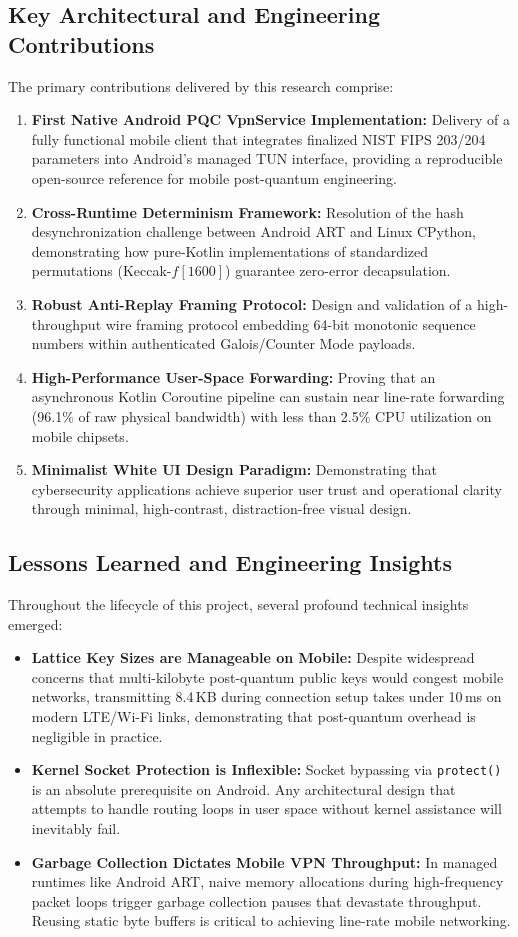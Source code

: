 \subsection{Key Architectural and Engineering Contributions}
The primary contributions delivered by this research comprise:
\begin{enumerate}
    \item \textbf{First Native Android PQC VpnService Implementation:} Delivery of a fully functional mobile client that integrates finalized NIST FIPS 203/204 parameters into Android's managed TUN interface, providing a reproducible open-source reference for mobile post-quantum engineering.
    \item \textbf{Cross-Runtime Determinism Framework:} Resolution of the hash desynchronization challenge between Android ART and Linux CPython, demonstrating how pure-Kotlin implementations of standardized permutations (Keccak-$f[1600]$) guarantee zero-error decapsulation.
    \item \textbf{Robust Anti-Replay Framing Protocol:} Design and validation of a high-throughput wire framing protocol embedding 64-bit monotonic sequence numbers within authenticated Galois/Counter Mode payloads.
    \item \textbf{High-Performance User-Space Forwarding:} Proving that an asynchronous Kotlin Coroutine pipeline can sustain near line-rate forwarding (96.1\% of raw physical bandwidth) with less than 2.5\% CPU utilization on mobile chipsets.
    \item \textbf{Minimalist White UI Design Paradigm:} Demonstrating that cybersecurity applications achieve superior user trust and operational clarity through minimal, high-contrast, distraction-free visual design.
\end{enumerate}

\subsection{Lessons Learned and Engineering Insights}
Throughout the lifecycle of this project, several profound technical insights emerged:
\begin{itemize}
    \item \textbf{Lattice Key Sizes are Manageable on Mobile:} Despite widespread concerns that multi-kilobyte post-quantum public keys would congest mobile networks, transmitting 8.4\,KB during connection setup takes under 10\,ms on modern LTE/Wi-Fi links, demonstrating that post-quantum overhead is negligible in practice.
    \item \textbf{Kernel Socket Protection is Inflexible:} Socket bypassing via \texttt{protect()} is an absolute prerequisite on Android. Any architectural design that attempts to handle routing loops in user space without kernel assistance will inevitably fail.
    \item \textbf{Garbage Collection Dictates Mobile VPN Throughput:} In managed runtimes like Android ART, naive memory allocations during high-frequency packet loops trigger garbage collection pauses that devastate throughput. Reusing static byte buffers is critical to achieving line-rate mobile networking.
\end{itemize}

